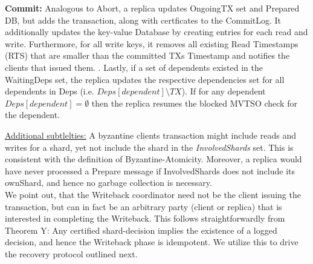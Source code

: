 \textbf{Commit:}
Analogous to Abort, a replica updates OngoingTX set and Prepared DB, but adds the transaction, along with certficates to the CommitLog. It additionally updates the key-value Database by creating entries for each read and write.  Furthermore, for all write keys, it removes all existing Read Timestamps (RTS) that are smaller than the committed TXs Timestamp and notifies the clients that issued them. . 
Lastly, if a set of dependents existed in the WaitingDeps set, the replica updates the respective dependencies set for all dependents in Deps (i.e. $Deps[dependent] \setminus TX$). If for any dependent $Deps[dependent] = \emptyset$ then the replica resumes the blocked MVTSO check for the dependent.



\underline{Additional subtlelties:}
 A byzantine clients transaction might include reads and writes for a shard, yet not include the shard in the \textit{InvolvedShards} set. This is consistent with the definition of Byzantine-Atomicity. Moreover, a replica would have never processed a Prepare message if InvolvedShards does not include its ownShard, and hence no garbage collection is necessary.\\

We point out, that the Writeback coordinator need not be the client issuing the transaction, but can in fact be an arbitrary party (client or replica) that is interested in completing the Writeback. This follows straightforwardly from Theorem Y: Any certified shard-decision implies the existence of a logged decision, and hence the Writeback phase is idempotent.
We utilize this to drive the recovery protocol outlined next. 



